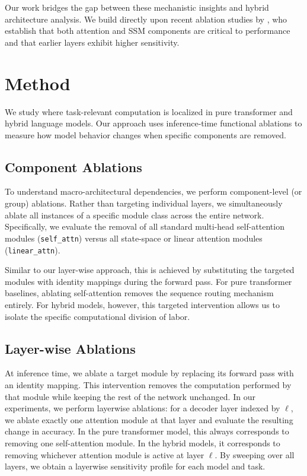 \documentclass{article}
\begin{document}
Our work bridges the gap between these mechanistic insights and hybrid architecture analysis. We build directly upon recent ablation studies by \cite{borobia2026functionalcomponentablationreveals}, who establish that both attention and SSM components are critical to performance and that earlier layers exhibit higher sensitivity.


\section{Method}
\label{sec:method}

We study where task-relevant computation is localized in pure transformer and hybrid language models. Our approach uses inference-time functional ablations to measure how model behavior changes when specific components are removed.

\subsection{Component Ablations}
To understand macro-architectural dependencies, we perform component-level (or group) ablations. Rather than targeting individual layers, we simultaneously ablate all instances of a specific module class across the entire network. Specifically, we evaluate the removal of all standard multi-head self-attention modules (\texttt{self\_attn}) versus all state-space or linear attention modules (\texttt{linear\_attn}). 

Similar to our layer-wise approach, this is achieved by substituting the targeted modules with identity mappings during the forward pass. For pure transformer baselines, ablating self-attention removes the sequence routing mechanism entirely. For hybrid models, however, this targeted intervention allows us to isolate the specific computational division of labor. 

\subsection{Layer-wise Ablations}
At inference time, we ablate a target module by replacing its forward pass with an identity mapping. 
This intervention removes the computation performed by that module while keeping the rest of the network unchanged. 
In our experiments, we perform layerwise ablations: for a decoder layer indexed by $\ell$, we ablate exactly one attention module at that layer and evaluate the resulting change in accuracy. 
In the pure transformer model, this always corresponds to removing one self-attention module. 
In the hybrid models, it corresponds to removing whichever attention module is active at layer $\ell$. 
By sweeping over all layers, we obtain a layerwise sensitivity profile for each model and task.
\end{document}

